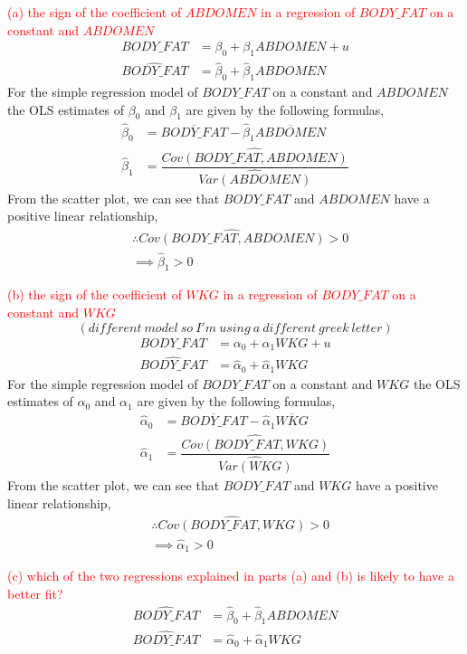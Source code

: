 \documentclass[12pt]{report}
\begin{document}
\noindent \textcolor{red}{(a) the sign of the coefficient of $ABDOMEN$ in a regression of $BODY\_FAT$ on a constant and $ABDOMEN$}
\begin{align*}
	BODY\_FAT &= \beta_0 + \beta_1 ABDOMEN + u \\
	\widehat{BODY\_FAT} &= \hat{\beta}_0 + \hat{\beta}_1 ABDOMEN
\end{align*}
\noindent For the simple regression model of $BODY\_FAT$ on a constant and $ABDOMEN$ the OLS estimates of $\beta_0$ and $\beta_1$ are given by the following formulas,
\begin{align*}
	\hat{\beta}_0 &= \overline{BODY\_FAT} - \hat{\beta}_1\overline{ABDOMEN} \\
	\hat{\beta}_1 &= \dfrac{\widehat{Cov(BODY\_FAT,ABDOMEN)}}{\widehat{Var(ABDOMEN)}}
\end{align*}
\noindent From the scatter plot, we can see that $BODY\_FAT$ and $ABDOMEN$ have a positive linear relationship, 
\begin{align*}
	&\therefore \widehat{Cov(BODY\_FAT,ABDOMEN)}>0 \\
	&\implies \hat{\beta}_1 > 0
\end{align*}

\noindent \textcolor{red}{(b) the sign of the coefficient of $WKG$ in a regression of $BODY\_FAT$ on a constant and $WKG$}$$(different\ model\ so\ I'm\ using\ a\ different\ greek\ letter)$$
\begin{align*}
BODY\_FAT &= \alpha_0 + \alpha_1 WKG + u \\
\widehat{BODY\_FAT} &= \hat{\alpha}_0 + \hat{\alpha}_1 WKG
\end{align*}
\noindent For the simple regression model of $BODY\_FAT$ on a constant and $WKG$ the OLS estimates of $\alpha_0$ and $\alpha_1$ are given by the following formulas,
\begin{align*}
\hat{\alpha}_0 &= \overline{BODY\_FAT} - \hat{\alpha}_1\overline{WKG} \\
\hat{\alpha}_1 &= \dfrac{\widehat{Cov(BODY\_FAT,WKG)}}{\widehat{Var(WKG)}}
\end{align*}
\noindent From the scatter plot, we can see that $BODY\_FAT$ and $WKG$ have a positive linear relationship, 
\begin{align*}
&\therefore \widehat{Cov(BODY\_FAT,WKG)}>0 \\
&\implies \hat{\alpha}_1 > 0
\end{align*}

\noindent \textcolor{red}{(c) which of the two regressions explained in parts (a) and (b) is likely to have a better fit?} 
\begin{align}
\widehat{BODY\_FAT} &= \hat{\beta}_0 + \hat{\beta}_1 ABDOMEN \\
\widehat{BODY\_FAT} &= \hat{\alpha}_0 + \hat{\alpha}_1 WKG
\end{align}
\end{document}
